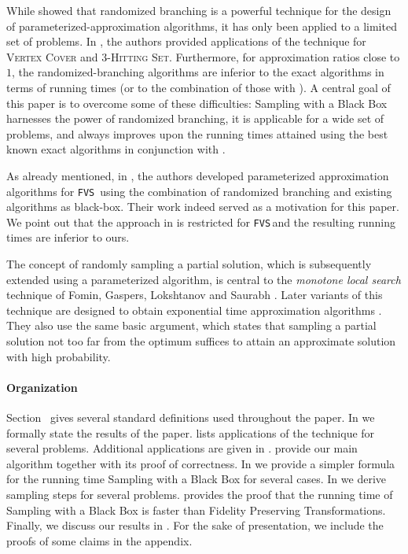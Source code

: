 \documentclass[letterpaper,11pt]{article}
\newcommand{\1}[1]{\mathds{1}\left[#1\right]}
\newcommand{\FVS}{\textnormal{\texttt{FVS}}\xspace}
\newcommand{\vc}{\textsc{Vertex Cover}\xspace}
\newcommand{\hs}[1]{\ensuremath{#1}\textsc{-Hitting Set}\xspace}
\begin{document}
While \cite{KulikS2020} showed that randomized branching is a powerful technique for the design of parameterized-approximation algorithms, it has only been applied to a limited set of problems.
 In \cite{KulikS2020}, the authors provided applications of the technique for \vc and \hs{3}. Furthermore, for approximation ratios close to $1$, the randomized-branching algorithms are inferior to the exact algorithms in terms of running times (or to the combination of those with \cite{Fellows2018}). A central goal of this paper is to overcome some of these difficulties: Sampling with a Black Box harnesses the power of randomized branching, it is applicable for a wide set of problems, and always improves upon the running times attained using the best known exact algorithms in conjunction with \cite{Fellows2018}.

As already mentioned, in \cite{janaParameterizedApproximationScheme2023}, the authors developed parameterized approximation algorithms for \FVS\ using the combination of randomized branching and existing algorithms as black-box. Their work indeed served as a motivation for this paper. We point out that the approach in \cite{janaParameterizedApproximationScheme2023} is restricted for \FVS\,and the resulting running times are inferior to ours. 

The concept of randomly sampling a partial solution, which is subsequently extended using a parameterized algorithm, is central to the {\em monotone local search} technique  of Fomin, Gaspers, Lokshtanov and Saurabh \cite{FGLS19}. Later variants of this technique are designed to obtain exponential time approximation algorithms \cite{EKMNS22,EKMNS23,EKMNS24}. They also use the same basic argument, which states that sampling a partial solution not too far from the optimum suffices to attain an approximate solution with high probability.

\paragraph{Organization} Section~ gives several standard definitions used throughout the paper. In  we formally state the results of the paper.  lists applications of the technique for several problems. Additional applications are  given in .  provide our main  algorithm together with its proof of correctness. 
In  we provide a simpler formula for the running time Sampling with a Black Box for several cases. 
In  we derive sampling steps for several problems.   provides the proof that the running time of Sampling with a Black Box is faster than Fidelity Preserving Transformations. Finally, we  discuss our results in .
For the sake of presentation, we include the proofs of some claims in the appendix.
\end{document}
